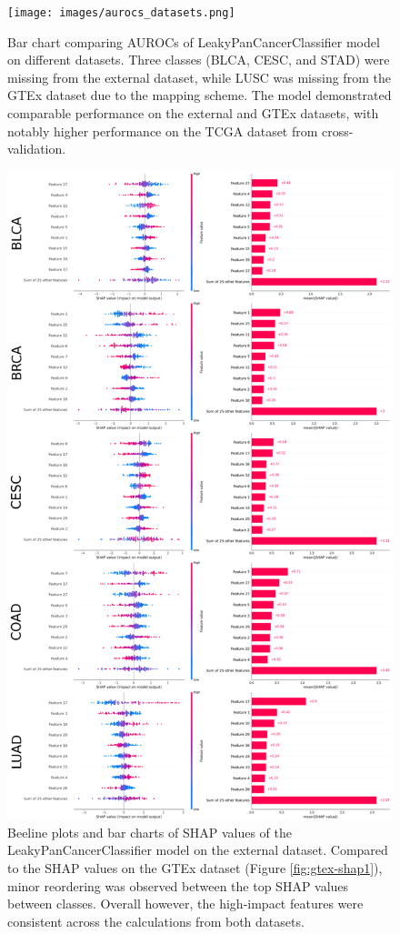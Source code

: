 \documentclass{l4proj}
\begin{document}
\begin{appendices}
\begin{figure}
    \centering
    \texttt{[image: images/aurocs\_datasets.png]}
    \caption{Bar chart comparing AUROCs of LeakyPanCancerClassifier model on different datasets. Three classes (BLCA, CESC, and STAD) were missing from the external dataset, while LUSC was missing from the GTEx dataset due to the mapping scheme. The model demonstrated comparable performance on the external and GTEx datasets, with notably higher performance on the TCGA dataset from cross-validation.}
    \label{fig:auroc-datasets}
\end{figure}

\begin{figure}
    \centering
    \includegraphics[width=0.85\linewidth]{images/ext_shap1.png}
    \caption{Beeline plots and bar charts of SHAP values of the LeakyPanCancerClassifier model on the external dataset. Compared to the SHAP values on the GTEx dataset (Figure \ref{fig:gtex-shap1}), minor reordering was observed between the top SHAP values between classes. Overall however, the high-impact features were consistent across the calculations from both datasets.}
    \label{fig:ext-shap1}
\end{figure}


\end{appendices}
\end{document}
